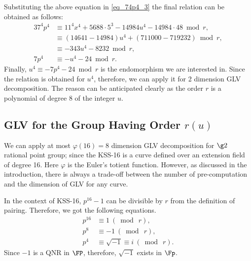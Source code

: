 Substituting the above equation in \eqref{eq_74p4_3} the final relation can be obtained as follows:
\begin{alignat}{3}
 7^4p^4  & \equiv 11^4x^4 + 5688 \cdot 5^3 - 14984 u^{4} - 14984 \cdot 48 \bmod r, \nonumber \\
  &\equiv  (14641-14984)u^4 + (711000-719232) \bmod r, \nonumber \\
  & \equiv  -343 u^4 -8232 \bmod r, \nonumber \\
  7p^4 & \equiv  -u^4 -24 \bmod r.  \label{eq_p_u_relation}
\end{alignat}
Finally, $u^4 \equiv -7p^4-24 \bmod r$ is the endomorphism we are interested in.
Since the relation is obtained for $u^4$, therefore, we can apply it for 2 dimension GLV decomposition.
The reason can be anticipated clearly as the order $r$ is a polynomial of degree 8 of the integer $u$.

\subsection{GLV for the Group Having Order $r(u)$}
We can apply at most $\varphi(16)= 8$ dimension GLV decomposition for $\g2$ rational point group; since the KSS-16 is a curve defined over an extension field of degree 16.
Here $\varphi$ is the Euler's totient function.
However, as discussed in the introduction, there is always a trade-off between the number of pre-computation and the dimension of GLV for any curve. 

In the context of KSS-16, $p^{16}-1$ can be divisible by $r$ from the definition of pairing.  Therefore, we got the following equations.
\begin{subequations}
\begin{alignat}{3}
p^{16} &\equiv 1~(\bmod~r), \\
\label{p8_m1}
p^{8}&\equiv -1~(\bmod~r),\\
\label{p4_i}
p^{4} &\equiv \sqrt{-1} \equiv i~(\bmod~r).
\end{alignat}
\end{subequations}
Since $-1$ is a QNR in $\FP$, therefore, $\sqrt{-1}$ exists in $\Fp$. 
